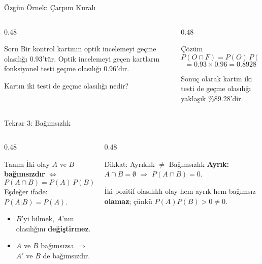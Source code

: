 \documentclass[light]{lutbeamer}
\begin{document}
\begin{frame}{Özgün Örnek: Çarpım Kuralı}
\small
\begin{columns}[T,onlytextwidth]
    \begin{column}{0.48\textwidth}
        \begin{block}{Soru}
            Bir kontrol kartının optik incelemeyi geçme olasılığı 0.93'tür. Optik incelemeyi geçen kartların fonksiyonel testi geçme olasılığı 0.96'dır.

            \vspace{0.15cm}
            Kartın iki testi de geçme olasılığı nedir?
        \end{block}
    \end{column}
    \begin{column}{0.48\textwidth}
        \begin{exampleblock}{Çözüm}
            \[
            P(O \cap F)=P(O)\,P(F|O)
            \]
            \[
            =0.93 \times 0.96 = 0.8928
            \]

            Sonuç olarak kartın iki testi de geçme olasılığı yaklaşık \%89.28'dir.
        \end{exampleblock}
    \end{column}
\end{columns}
\end{frame}

\begin{frame}{Tekrar 3: Bağımsızlık}
    \begin{columns}[T]
        \begin{column}{0.48\textwidth}
            \begin{block}{Tanım}
                İki olay $A$ ve $B$ \textbf{bağımsızdır} $\iff$
                \[
                P(A \cap B) = P(A)\, P(B)
                \]
                Eşdeğer ifade: $P(A|B) = P(A)$.
            \end{block}

            \begin{itemize}
                \item $B$'yi bilmek, $A$'nın olasılığını \textbf{değiştirmez}.
                \item $A$ ve $B$ bağımsızsa $\Rightarrow$ $A'$ ve $B$ de bağımsızdır.
            \end{itemize}
        \end{column}
        \begin{column}{0.48\textwidth}
            \begin{alertblock}{Dikkat: Ayrıklık $\neq$ Bağımsızlık}
                \textbf{Ayrık:} $A \cap B = \emptyset$ $\Rightarrow$ $P(A \cap B)=0$.

                \vspace{0.15cm}
                İki pozitif olasılıklı olay hem ayrık hem bağımsız \textbf{olamaz}; çünkü $P(A)P(B) > 0 \neq 0$.
            \end{alertblock}
        \end{column}
    \end{columns}
\end{frame}
\end{document}
